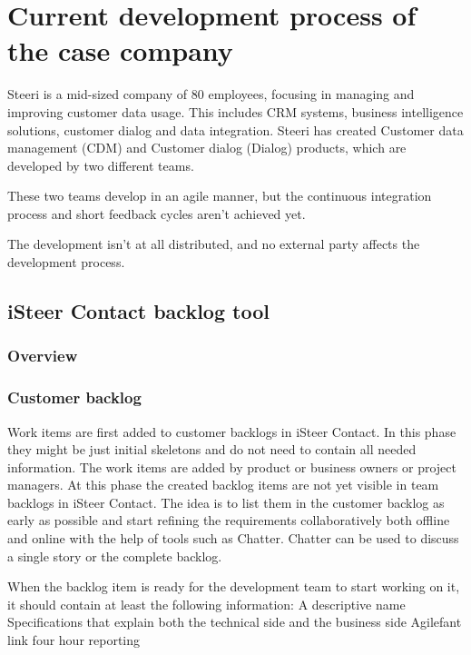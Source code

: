 \documentclass[english]{tktltiki2}
\theoremstyle{definition}
\theoremstyle{remark}
\begin{document}

\section{Current development process of the case company}	
Steeri is a mid-sized company of 80 employees, focusing in managing and improving customer data usage. This includes CRM systems, business intelligence solutions, customer dialog and data integration. Steeri has created Customer data management (CDM) and Customer dialog (Dialog) products, which are developed by two different teams. 

These two teams develop in an agile manner, but the continuous integration process \cite{fowler2006continuous} and short feedback cycles aren't achieved yet. 

The development isn't at all distributed, and no external party affects the development process. 

\subsection{iSteer Contact backlog tool}

\subsubsection{Overview}

\subsubsection{Customer backlog}
Work items are first added to customer backlogs in iSteer Contact. In this phase they might be just initial skeletons and do not need to contain all needed information. The work items are added by product or business owners or project managers. At this phase the created backlog items are not yet visible in team backlogs in iSteer Contact. The idea is to list them in the customer backlog as early as possible and start refining the requirements collaboratively both offline and online with the help of tools such as Chatter. Chatter can be used to discuss a single story or the complete backlog.

When the backlog item is ready for the development team to start working on it, it should contain at least the following information:
A descriptive name
Specifications that explain both the technical side and the business side
Agilefant link four hour reporting
\end{document}
